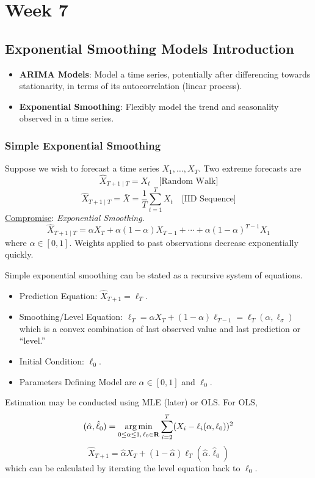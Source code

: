 \chapter{Week 7}
\section{Exponential Smoothing Models Introduction}
\begin{itemize}
    \item \textbf{ARIMA Models}: Model a time series, potentially after differencing towards
          stationarity, in terms of its autocorrelation (linear process).
    \item \textbf{Exponential Smoothing}: Flexibly model the trend and seasonality
          observed in a time series.
\end{itemize}
\subsection*{Simple Exponential Smoothing}
Suppose we wish to forecast a time series $ X_1,\ldots,X_T $. Two extreme
forecasts are
\[ \hat{X}_{T+1\mid T}=X_t\quad\text{[Random Walk]} \]
\[ \hat{X}_{T+1\mid T}=\bar{X}=\frac{1}{T} \sum_{t=1}^{T} X_t \quad\text{[IID Sequence]} \]
\underline{Compromise}: \emph{Exponential Smoothing}.
\[ \hat{X}_{T+1\mid T}=\alpha X_T+\alpha(1-\alpha)X_{T-1}+\cdots+\alpha(1-\alpha)^{T-1}X_1 \]
where $ \alpha\in[0,1] $. Weights applied to past observations decrease exponentially quickly.

Simple exponential smoothing can be stated as a recursive system of equations.
\begin{itemize}
    \item Prediction Equation: $ \hat{X}_{T+1}=\ell_T $.
    \item Smoothing/Level Equation: $ \ell_T=\alpha X_T+(1-\alpha)\ell_{T-1}=\ell_T(\alpha,\ell_\sigma) $
          which is a convex combination of last observed value and last prediction or ``level.''
    \item Initial Condition: $ \ell_0 $.
    \item Parameters Defining Model are $ \alpha\in[0,1] $ and $ \ell_0 $.
\end{itemize}
Estimation may be conducted using MLE (later) or OLS\@. For OLS,
\[ (\hat{\alpha},\hat{\ell}_0)=\operatorname*{arg\,min}_{0\le \alpha\le 1,\,\ell_0\in\mathbf{R}}
    \sum_{i=2}^{T} (X_i-\ell_i(\alpha,\ell_0))^2 \]
\[ \hat{X}_{T+1}=\hat{\alpha}X_T+(1-\hat{\alpha})\ell_T(\hat{\alpha}.\hat{\ell}_0) \]
which can be calculated by iterating the level equation back to $ \ell_0 $.

